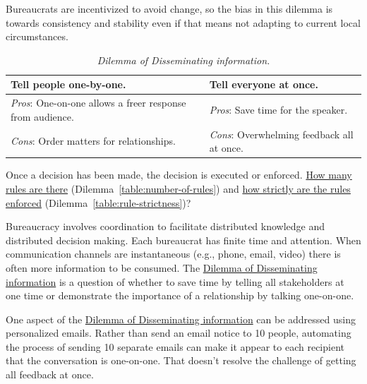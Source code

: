 Bureaucrats are incentivized to avoid change, so the bias in this dilemma is towards consistency and stability even if that means not adapting to current local circumstances. 

\begin{center}
\begin{table}[H] %
\begin{tabular}{ | m{\dilemmatablewidth}| m{\dilemmatablewidth} | } 
  \hline
  \textbf{Tell people one-by-one.} & 
  \textbf{Tell everyone at once.} \\ 
  \hline
  \textit{Pros}: One-on-one allows a freer response from audience. &
  \textit{Pros}: Save time for the speaker. \\
  \hline
  \textit{Cons}: Order matters for relationships. & 
  \textit{Cons}: Overwhelming feedback all at once. \\  
  \hline
\end{tabular}
\caption{
\textit{Dilemma of Disseminating information.}
}
\label{table:disseminate-one-by-one}
\end{table}
\end{center}

Once a decision has been made, the decision is executed or enforced. \hyperref[table:number-of-rules]{How many rules are there} (Dilemma~\ref{table:number-of-rules}) and
\hyperref[table:rule-strictness]{how strictly are the rules enforced} (Dilemma~\ref{table:rule-strictness})?

Bureaucracy involves coordination to facilitate distributed knowledge and distributed decision making. Each bureaucrat has finite time and attention. When communication channels are instantaneous (e.g., phone, email, video) there is often more information to be consumed.
The \href{table:disseminate-one-by-one}{Dilemma of Disseminating information} is a question of whether to save time by telling all stakeholders at one time or demonstrate the importance of a relationship by talking one-on-one. 


One aspect of the \href{table:disseminate-one-by-one}{Dilemma of Disseminating information} can be addressed using personalized emails. Rather than send an email notice to 10 people, automating the process of sending 10 separate emails can make it appear to each recipient that the conversation is one-on-one.  That doesn't resolve the challenge of getting all feedback at once.

